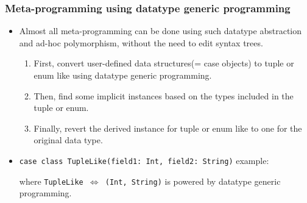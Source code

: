 \begin{frame}[fragile]
  \frametitle{Meta-programming using datatype generic programming}
  
  \begin{itemize}
    \item Almost all meta-programming can be done using such datatype abstraction
    and ad-hoc polymorphism, without the need to edit syntax trees.
    \pause
    \begin{enumerate}
      \item First, convert user-defined data structures(= case objects) to tuple or enum like using datatype generic programming.
      \item Then, find some implicit instances based on the types included in the tuple or enum.
      \item Finally, revert the derived instance for tuple or enum like to one for the original data type.
    \end{enumerate}

    \pause
    \item \lstinline|case class TupleLike(field1: Int, field2: String)| example:
    \begin{scaledprooftree}{0.8}
    \end{scaledprooftree}
    where {\small \texttt{TupleLike $\Leftrightarrow$ (Int, String)}} is powered by datatype generic programming.
  \end{itemize}

\end{frame}

